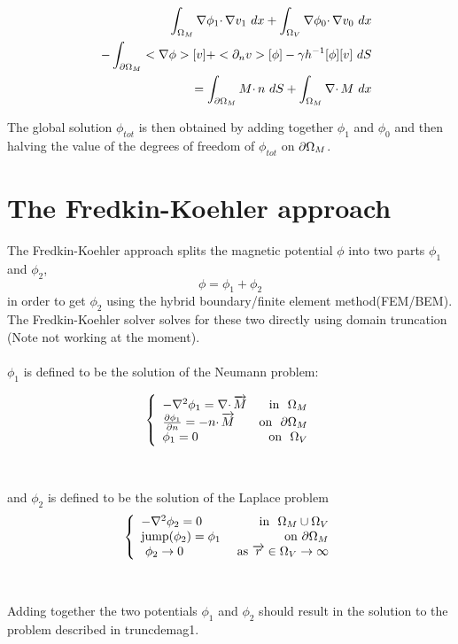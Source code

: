 \documentclass[12pt,a4paper,notitlepage]{article}
\begin{document}
\begin{eqnarray*}
&&\int_{\Omega_M} \nabla \phi_1 \cdotp \nabla v_1 \ dx + \int_{\Omega_V} \nabla \phi_0 \cdotp \nabla v_0 \ dx \\
&&- \int_{\partial \Omega_M} <\nabla \phi> [v]  + <\partial_n v> [\phi] - \gamma h^{-1} [\phi][v] \ dS \\
&&= \int_{\partial \Omega_M} M  \cdotp n \ dS + \int_{\Omega_M} \nabla \cdotp M \ dx
\end{eqnarray*}

The global solution $\phi_{tot}$ is then obtained by adding together $\phi_1$ and $\phi_0$ and then halving the value
of the degrees of freedom of $\phi_{tot}$ on $\partial \Omega_M$.


\section{The Fredkin-Koehler approach} 
The Fredkin-Koehler approach splits the magnetic potential $\phi$ into two parts $\phi_1$ and $\phi_2$, 
\[ \phi = \phi_1 + \phi_2 \]
\noindent in order to get $\phi_2$ using the hybrid boundary/finite element method(FEM/BEM).
The Fredkin-Koehler solver solves for these two directly using domain truncation (Note not working at the moment).
\\
\\
\noindent $\phi_1$ is defined to be the solution of the Neumann problem:

\[ 
\left\{
\begin{array}{lr}
- \nabla^2 \phi_1 = \nabla \cdotp \overrightarrow{M}  & \mbox{in } \ \Omega_M \\
 \frac{\partial \phi_1}{\partial n}  = -n \cdotp \overrightarrow{M} & \mbox{on } \  \partial \Omega_M \\
 \phi_1 = 0 & \mbox{on} \ \ \Omega_V
\end{array}
\right. 
\]
\\
\\
\noindent and $\phi_2$ is defined to be the solution of the Laplace problem
\[ 
\left\{
\begin{array}{lr}
- \nabla^2 \phi_2 = 0 & \mbox{in } \ \Omega_M \cup \Omega_V \\
\mbox{jump}(\phi_2) = \phi_1 & \mbox{on} \ \partial \Omega_M \\
\ \phi_2 \rightarrow 0 & \ \mbox{as} \ \overrightarrow{r} \in \Omega_V \rightarrow \infty
\end{array}
\right. 
\]
\\
\\
\noindent Adding together the two potentials $\phi_1$ and $\phi_2$ should result in the solution to the problem described in
truncdemag1. 
\end{document}
